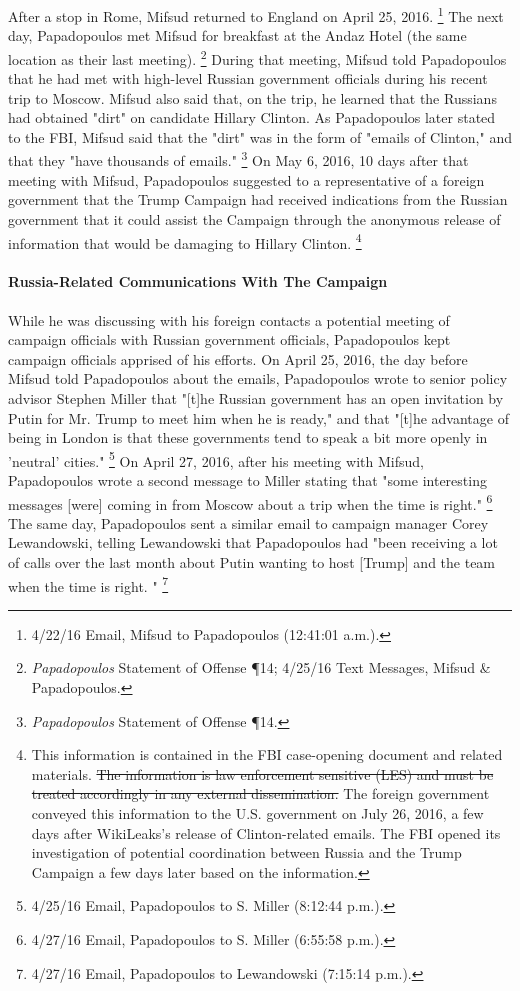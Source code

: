 After a stop in Rome, Mifsud returned to England on April 25, 2016.%
\footnote{4/22/16 Email, Mifsud to Papadopoulos (12:41:01 a.m.).}
The next day, Papadopoulos met Mifsud for breakfast at the Andaz Hotel (the same location as their last meeting).%
\footnote{\textit{Papadopoulos} Statement of Offense \P 14;
4/25/16 Text Messages, Mifsud \& Papadopoulos.}
During that meeting, Mifsud told Papadopoulos that he had met with high-level Russian government officials during his recent trip to Moscow.
Mifsud also said that, on the trip, he learned that the Russians had obtained "dirt" on candidate Hillary Clinton.
As Papadopoulos later stated to the FBI, Mifsud said that the "dirt" was in the form of "emails of Clinton," and that they "have thousands of emails."%
\footnote{\textit{Papadopoulos} Statement of Offense \P 14.}
On May 6, 2016, 10 days after that meeting with Mifsud, Papadopoulos suggested to a representative of a foreign government that the Trump Campaign had received indications from the Russian government that it could assist the Campaign through the anonymous release of information that would be damaging to Hillary Clinton.%
\footnote{This information is contained in the FBI case-opening document and related materials.
\sout{The information is law enforcement sensitive (LES) and must be treated accordingly in any external dissemination.}
The foreign government conveyed this information to the U.S. government on July 26, 2016, a few days after WikiLeaks’s release of Clinton-related emails.
The FBI opened its investigation of potential coordination between Russia and the Trump Campaign a few days later based on the information.}

\paragraph{Russia-Related Communications With The Campaign}

While he was discussing with his foreign contacts a potential meeting of campaign officials with Russian government officials, Papadopoulos kept campaign officials apprised of his efforts.
On April 25, 2016, the day before Mifsud told Papadopoulos about the emails, Papadopoulos wrote to senior policy advisor Stephen Miller that "[t]he Russian government has an open invitation by Putin for Mr. Trump to meet him when he is ready," and that "[t]he advantage of being in London is that these governments tend to speak a bit more openly in 'neutral' cities."%
\footnote{4/25/16 Email, Papadopoulos to S. Miller (8:12:44 p.m.).}
On April 27, 2016, after his meeting with Mifsud, Papadopoulos wrote a second message to Miller stating that "some interesting messages [were] coming in from Moscow about a trip when the time is right."%
\footnote{4/27/16 Email, Papadopoulos to S. Miller (6:55:58 p.m.).}
The same day, Papadopoulos sent a similar email to campaign manager Corey Lewandowski, telling Lewandowski that Papadopoulos had "been receiving a lot of calls over the last month about Putin wanting to host [Trump] and the team when the time is right. "%
\footnote{4/27/16 Email, Papadopoulos to Lewandowski (7:15:14 p.m.).}

